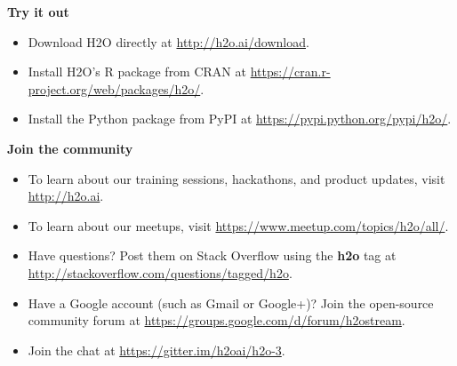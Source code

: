 \documentclass{standalone}
\begin{document}
\textbf{Try it out}

\begin{itemize}
\setlength\itemsep{1pt}
\item  Download H2O directly at {\url{http://h2o.ai/download}}.
\item Install H2O's R package from CRAN at {\url{https://cran.r-project.org/web/packages/h2o/}}. 
\item Install the Python package from PyPI at {\url{https://pypi.python.org/pypi/h2o/}}.

\end{itemize}


\begin{minipage}{\textwidth}
\textbf{Join the community}
\setlength{\parskip}{1em}
\begin{itemize}
\setlength\itemsep{1pt}
\item To learn about our training sessions, hackathons, and product updates, visit {\url{http://h2o.ai}}. 
\item To learn about our meetups, visit {\url{https://www.meetup.com/topics/h2o/all/}}.
\item Have questions? Post them on Stack Overflow using the \textbf{h2o} tag at {\url{http://stackoverflow.com/questions/tagged/h2o}}.
\item Have a Google account (such as Gmail or Google+)? Join the open-source community forum at {\url{https://groups.google.com/d/forum/h2ostream}}.
\item Join the chat at {\url{https://gitter.im/h2oai/h2o-3}}.
\end{itemize}
\end{minipage}
\end{document}

